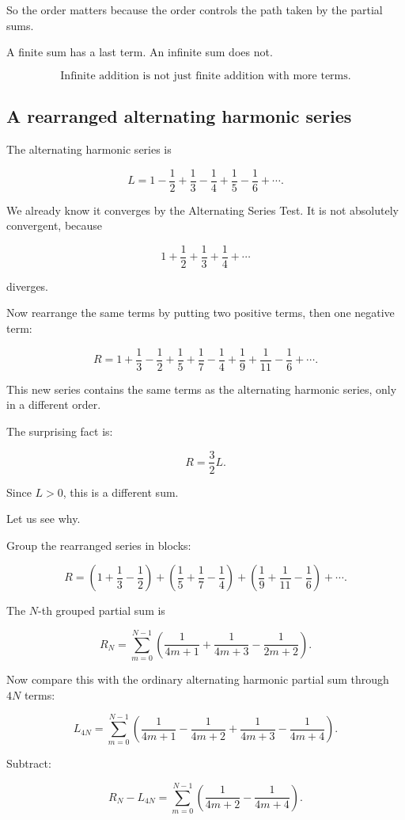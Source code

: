 So the order matters because the order controls the path taken by the partial sums.

A finite sum has a last term.  An infinite sum does not.

\[
\boxed{
\text{Infinite addition is not just finite addition with more terms.}
}
\]

\subsection{A rearranged alternating harmonic series}
\label{subsec:rearranged-alternating-harmonic}

The alternating harmonic series is

\[
L=
1-\frac12+\frac13-\frac14+\frac15-\frac16+\cdots.
\]

We already know it converges by the Alternating Series Test.  It is not absolutely
convergent, because

\[
1+\frac12+\frac13+\frac14+\cdots
\]

diverges.

Now rearrange the same terms by putting two positive terms, then one negative term:

\[
R=
1+\frac13-\frac12
+\frac15+\frac17-\frac14
+\frac19+\frac1{11}-\frac16+\cdots.
\]

This new series contains the same terms as the alternating harmonic series, only in a
different order.

The surprising fact is:

\[
\boxed{
R=\frac32 L.
}
\]

Since \(L>0\), this is a different sum.

Let us see why.

Group the rearranged series in blocks:

\[
R=
\left(1+\frac13-\frac12\right)
+
\left(\frac15+\frac17-\frac14\right)
+
\left(\frac19+\frac1{11}-\frac16\right)
+\cdots.
\]

The \(N\)-th grouped partial sum is

\[
R_N=
\sum_{m=0}^{N-1}
\left(
\frac1{4m+1}
+
\frac1{4m+3}
-
\frac1{2m+2}
\right).
\]

Now compare this with the ordinary alternating harmonic partial sum through \(4N\)
terms:

\[
L_{4N}
=
\sum_{m=0}^{N-1}
\left(
\frac1{4m+1}
-\frac1{4m+2}
+\frac1{4m+3}
-\frac1{4m+4}
\right).
\]

Subtract:

\[
R_N-L_{4N}
=
\sum_{m=0}^{N-1}
\left(
\frac1{4m+2}
-\frac1{4m+4}
\right).
\]

